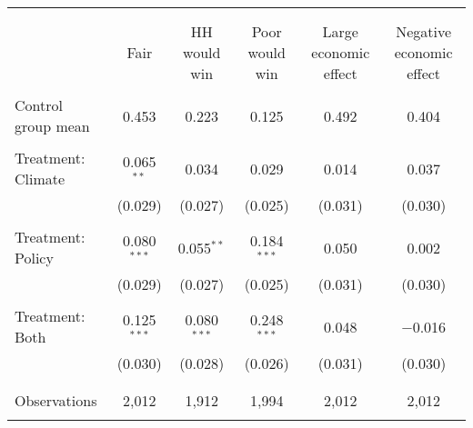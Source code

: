 
\begin{tabular}{@{\extracolsep{5pt}}lccccc} 
\\[-1.8ex]\hline 
\hline \\[-1.8ex] 
\\[-1.8ex] & Fair & HH would win & Poor would win & Large economic effect & Negative economic effect \\ 
\hline \\[-1.8ex] 
 Control group mean & 0.453 & 0.223 & 0.125 & 0.492 & 0.404  \\ \hline \\[-1.8ex] Treatment: Climate & 0.065$^{**}$ & 0.034 & 0.029 & 0.014 & 0.037 \\ 
  & (0.029) & (0.027) & (0.025) & (0.031) & (0.030) \\ 
  & & & & & \\ 
 Treatment: Policy & 0.080$^{***}$ & 0.055$^{**}$ & 0.184$^{***}$ & 0.050 & 0.002 \\ 
  & (0.029) & (0.027) & (0.025) & (0.031) & (0.030) \\ 
  & & & & & \\ 
 Treatment: Both & 0.125$^{***}$ & 0.080$^{***}$ & 0.248$^{***}$ & 0.048 & $-$0.016 \\ 
  & (0.030) & (0.028) & (0.026) & (0.031) & (0.030) \\ 
  & & & & & \\ 
\hline \\[-1.8ex] 

Observations & 2,012 & 1,912 & 1,994 & 2,012 & 2,012 \\ 
\hline 
\hline \\[-1.8ex] 
\end{tabular} 